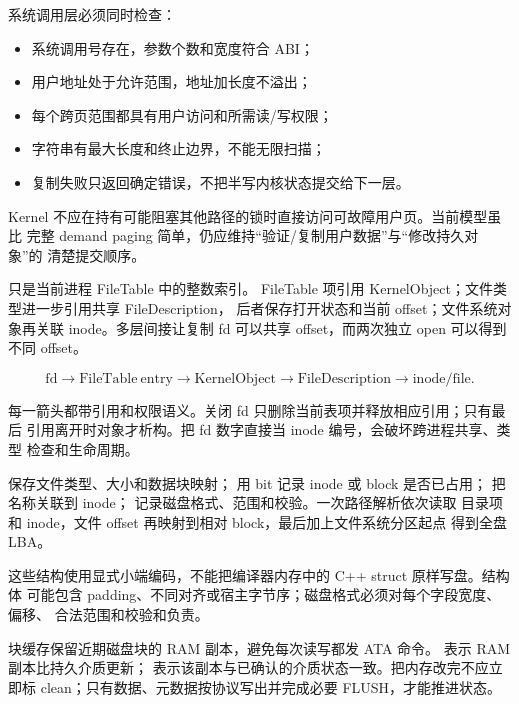 系统调用层必须同时检查：

\begin{itemize}[leftmargin=2em]
  \item 系统调用号存在，参数个数和宽度符合 ABI；
  \item 用户地址处于允许范围，地址加长度不溢出；
  \item 每个跨页范围都具有用户访问和所需读/写权限；
  \item 字符串有最大长度和终止边界，不能无限扫描；
  \item 复制失败只返回确定错误，不把半写内核状态提交给下一层。
\end{itemize}

Kernel 不应在持有可能阻塞其他路径的锁时直接访问可故障用户页。当前模型虽比
完整 demand paging 简单，仍应维持“验证/复制用户数据”与“修改持久对象”的
清楚提交顺序。

只是当前进程 FileTable 中的整数索引。
FileTable 项引用 KernelObject；文件类型进一步引用共享 FileDescription，
后者保存打开状态和当前 offset；文件系统对象再关联 inode。多层间接让复制 fd
可以共享 offset，而两次独立 open 可以得到不同 offset。

\[
\mathrm{fd}
\rightarrow \mathrm{FileTable\ entry}
\rightarrow \mathrm{KernelObject}
\rightarrow \mathrm{FileDescription}
\rightarrow \mathrm{inode/file}.
\]

每一箭头都带引用和权限语义。关闭 fd 只删除当前表项并释放相应引用；只有最后
引用离开时对象才析构。把 fd 数字直接当 inode 编号，会破坏跨进程共享、类型
检查和生命周期。

保存文件类型、大小和数据块映射；
用 bit 记录 inode 或 block 是否已占用；
把名称关联到 inode；
记录磁盘格式、范围和校验。一次路径解析依次读取
目录项和 inode，文件 offset 再映射到相对 block，最后加上文件系统分区起点
得到全盘 LBA。

这些结构使用显式小端编码，不能把编译器内存中的 C++ struct 原样写盘。结构体
可能包含 padding、不同对齐或宿主字节序；磁盘格式必须对每个字段宽度、偏移、
合法范围和校验和负责。

块缓存保留近期磁盘块的 RAM 副本，避免每次读写都发 ATA 命令。
表示 RAM 副本比持久介质更新；
表示该副本与已确认的介质状态一致。把内存改完不应立即标
clean；只有数据、元数据按协议写出并完成必要 FLUSH，才能推进状态。

